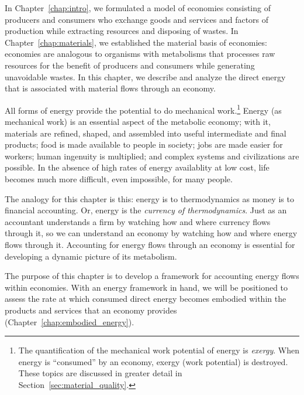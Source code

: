 
In Chapter~\ref{chap:intro}, we formulated a model of economies
consisting of producers and consumers who exchange
goods and services and factors of production 
while extracting resources and disposing of wastes. 
In Chapter~\ref{chap:materials}, we established the material basis of economies: 
economies are analogous to organisms with metabolisms that processes
raw resources for the benefit of producers and consumers 
while generating unavoidable wastes.
In this chapter, we describe and analyze the 
direct energy
that is associated with material flows
through an economy.

All forms of energy provide the potential to do mechanical work.\footnote{The 
quantification of the mechanical work potential of energy is \emph{exergy}.
When energy is ``consumed'' by an economy, exergy (work potential) is destroyed.
These topics are discussed in greater detail in Section~\ref{sec:material_quality}.}
Energy (as mechanical work) 
is an essential aspect of the metabolic economy;
with it, materials are refined, shaped, and assembled
into useful intermediate and final products; 
food is made available to people in society; 
jobs are made easier for workers;
human ingenuity is multiplied;
and complex systems and civilizations are possible.
In the absence of high rates of energy availablity at low cost,
life becomes much more difficult, even impossible, for many people.

The analogy for this chapter is this: 
energy is to thermodynamics as money is to financial accounting.
Or, energy is the \emph{currency of thermodynamics}.
Just as an accountant understands a firm by watching how and where
currency flows through it, so we can understand an economy by watching
how and where energy flows through it.
Accounting for energy flows through an economy
is essential for developing a dynamic picture 
of its metabolism.

The purpose of this chapter is to develop 
a framework for accounting energy flows within economies.
With an energy framework in hand, we will be positioned 
to assess the rate at which
consumed direct energy becomes embodied within the products and 
services that an economy provides
(Chapter~\ref{chap:embodied_energy}).


